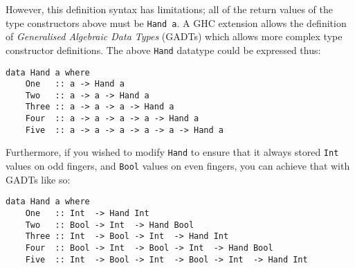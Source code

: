 \documentclass[12pt, a4paper, bibliography=totocnumbered]{scrreprt}
\newcommand{\inline}[1]{\lstinline[basicstyle=\ttfamily\footnotesize]{#1}}
\begin{document}
However, this definition syntax has limitations; all of the return values of the type constructors above must be \inline{Hand a}. A GHC extension allows the definition of \emph{Generalised Algebraic Data Types} (GADTs) \cite{gadts} which allows more complex type constructor definitions. The above \inline{Hand} datatype could be expressed thus:

\begin{lstlisting}
data Hand a where
    One   :: a -> Hand a
    Two   :: a -> a -> Hand a
    Three :: a -> a -> a -> Hand a
    Four  :: a -> a -> a -> a -> Hand a
    Five  :: a -> a -> a -> a -> a -> Hand a
\end{lstlisting}

Furthermore, if you wished to modify \inline{Hand} to ensure that it always stored \inline{Int} values on odd fingers, and \inline{Bool} values on even fingers, you can achieve that with GADTs like so:

\begin{lstlisting}
data Hand a where
    One   :: Int  -> Hand Int
    Two   :: Bool -> Int  -> Hand Bool
    Three :: Int  -> Bool -> Int  -> Hand Int
    Four  :: Bool -> Int  -> Bool -> Int  -> Hand Bool
    Five  :: Int  -> Bool -> Int  -> Bool -> Int  -> Hand Int
\end{lstlisting}




\end{document}
